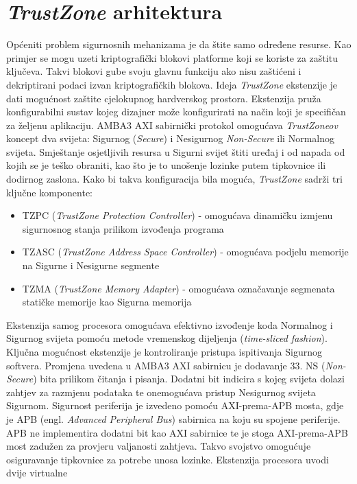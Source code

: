 \documentclass[times, utf8, diplomski, numeric]{fer}
\begin{document}
\section{\textit{TrustZone} arhitektura}
Općeniti problem sigurnosnih mehanizama je da štite samo određene resurse. Kao primjer se mogu uzeti kriptografički blokovi
platforme koji se koriste za zaštitu ključeva. Takvi blokovi gube svoju glavnu funkciju ako nisu zaštićeni i dekriptirani
podaci izvan kriptografičkih blokova. Ideja \textit{TrustZone} ekstenzije je dati mogućnost zaštite cjelokupnog hardverskog
prostora. Ekstenzija pruža konfigurabilni sustav kojeg dizajner može konfigurirati na način koji je specifičan za željenu
aplikaciju. AMBA3 AXI sabirnički protokol omogućava \textit{TrustZoneov} koncept dva svijeta: Sigurnog (\textit{Secure}) i
Nesigurnog \textit{Non-Secure} ili Normalnog svijeta. Smještanje osjetljivih resursa u Sigurni svijet štiti uređaj i od napada
od kojih se je teško obraniti, kao što je to unošenje lozinke putem tipkovnice ili dodirnog zaslona.
Kako bi takva konfiguracija bila moguća, \textit{TrustZone} sadrži tri ključne komponente:
\begin{itemize}
  \item{TZPC (\textit{TrustZone Protection Controller}) - omogućava dinamičku izmjenu sigurnosnog stanja prilikom izvođenja
  programa}
  \item{TZASC (\textit{TrustZone Address Space Controller}) - omogućava podjelu memorije na Sigurne i Nesigurne segmente}
  \item{TZMA (\textit{TrustZone Memory Adapter}) - omogućava označavanje segmenata statičke memorije kao Sigurna memorija}
\end{itemize}
Ekstenzija samog procesora
omogućava efektivno izvođenje koda Normalnog i Sigurnog svijeta pomoću metode vremenskog dijeljenja (\textit{time-sliced
fashion}). Ključna mogućnost ekstenzije je kontroliranje pristupa ispitivanja Sigurnog softvera. Promjena uvedena u AMBA3
AXI sabirnicu je dodavanje 33. NS (\textit{Non-Secure}) bita prilikom čitanja i pisanja. Dodatni bit indicira s kojeg
svijeta dolazi zahtjev za razmjenu podataka te onemogućava pristup Nesigurnog svijeta Sigurnom. Sigurnost periferija je
izvedeno pomoću AXI-prema-APB mosta, gdje je APB (engl. \textit{Advanced Peripheral Bus}) sabirnica na koju su spojene
periferije. APB ne implementira dodatni bit kao AXI sabirnice te je stoga AXI-prema-APB most zadužen za provjeru valjanosti
zahtjeva. Takvo svojstvo omogućuje osiguravanje tipkovnice za potrebe unosa lozinke. Ekstenzija procesora uvodi dvije virtualne
\end{document}

